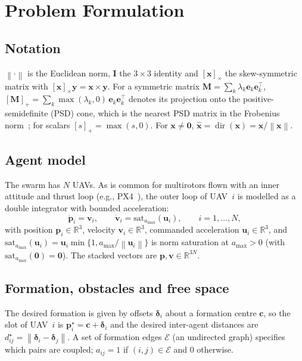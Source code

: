 \documentclass[11pt]{article}
\theoremstyle{definition}
\theoremstyle{remark}
\newcommand{\R}{\mathbb{R}}
\newcommand{\bp}{\mathbf{p}}
\newcommand{\bv}{\mathbf{v}}
\newcommand{\bu}{\mathbf{u}}
\newcommand{\bx}{\mathbf{x}}
\newcommand{\bI}{\mathbf{I}}
\newcommand{\bdelta}{\bm{\delta}}
\newcommand{\norm}[1]{\left\lVert #1 \right\rVert}
\newcommand{\pos}[1]{\left[#1\right]_{+}}
\newcommand{\amax}{a_{\max}}
\begin{document}
\section{Problem Formulation}\label{sec:problem}

\subsection{Notation}
$\norm{\cdot}$ is the Euclidean norm, $\bI$ the $3\times3$ identity and
$[\bx]_\times$ the skew-symmetric matrix with $[\bx]_\times\mathbf{y}=\bx\times\mathbf{y}$.
For a symmetric matrix $\mathbf{M}=\sum_k\lambda_k\mathbf{e}_k\mathbf{e}_k^\top$,
$\pos{\mathbf{M}}=\sum_k\max(\lambda_k,0)\,\mathbf{e}_k\mathbf{e}_k^\top$ denotes
its projection onto the positive-semidefinite (PSD) cone, which is the nearest
PSD matrix in the Frobenius norm~\cite{higham1988}; for scalars
$[s]_+=\max(s,0)$. For $\bx\neq\mathbf{0}$, $\hat{\bx}=\operatorname{dir}(\bx)=\bx/\norm{\bx}$.

\subsection{Agent model}
The swarm has $N$ UAVs. As is common for multirotors flown with an inner
attitude and thrust loop (e.g., PX4~\cite{meier2015px4}), the outer loop of
UAV~$i$ is modelled as a double integrator with bounded acceleration:
\begin{equation}\label{eq:model}
  \dot{\bp}_i=\bv_i,\qquad \dot{\bv}_i=\mathrm{sat}_{\amax}(\bu_i),\qquad i=1,\dots,N,
\end{equation}
with position $\bp_i\in\R^3$, velocity $\bv_i\in\R^3$, commanded acceleration
$\bu_i\in\R^3$, and $\mathrm{sat}_{\amax}(\bu_i)
=\bu_i\min\{1,\amax/\norm{\bu_i}\}$ is norm saturation at $\amax>0$
(with $\mathrm{sat}_{\amax}(\mathbf{0})=\mathbf{0}$). The stacked vectors are
$\bp,\bv\in\R^{3N}$.

\subsection{Formation, obstacles and free space}
The desired formation is given by offsets $\bdelta_i$ about a formation centre
$\mathbf{c}$, so the slot of UAV~$i$ is $\bp_i^\star=\mathbf{c}+\bdelta_i$ and
the desired inter-agent distances are $d_{ij}^\star=\norm{\bdelta_i-\bdelta_j}$.
A set of formation edges $\mathcal{E}$ (an undirected graph) specifies which
pairs are coupled; $a_{ij}=1$ if $(i,j)\in\mathcal{E}$ and $0$ otherwise.
\end{document}
